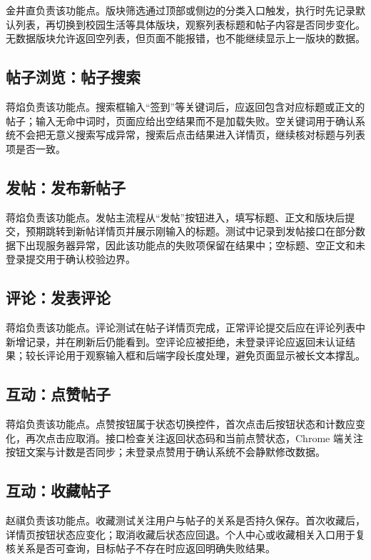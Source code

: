 \documentclass[bwprint]{report}
\begin{document}
金井直负责该功能点。版块筛选通过顶部或侧边的分类入口触发，执行时先记录默认列表，再切换到校园生活等具体版块，观察列表标题和帖子内容是否同步变化。无数据版块允许返回空列表，但页面不能报错，也不能继续显示上一版块的数据。

\subsection{帖子浏览：帖子搜索}

蒋焰负责该功能点。搜索框输入“签到”等关键词后，应返回包含对应标题或正文的帖子；输入无命中词时，页面应给出空结果而不是加载失败。空关键词用于确认系统不会把无意义搜索写成异常，搜索后点击结果进入详情页，继续核对标题与列表项是否一致。

\subsection{发帖：发布新帖子}

蒋焰负责该功能点。发帖主流程从“发帖”按钮进入，填写标题、正文和版块后提交，预期跳转到新帖详情页并展示刚输入的标题。测试中记录到发帖接口在部分数据下出现服务器异常，因此该功能点的失败项保留在结果中；空标题、空正文和未登录提交用于确认校验边界。

\subsection{评论：发表评论}

蒋焰负责该功能点。评论测试在帖子详情页完成，正常评论提交后应在评论列表中新增记录，并在刷新后仍能看到。空评论应被拒绝，未登录评论应返回未认证结果；较长评论用于观察输入框和后端字段长度处理，避免页面显示被长文本撑乱。

\subsection{互动：点赞帖子}

蒋焰负责该功能点。点赞按钮属于状态切换控件，首次点击后按钮状态和计数应变化，再次点击应取消。接口检查关注返回状态码和当前点赞状态，Chrome 端关注按钮文案与计数是否同步；未登录点赞用于确认系统不会静默修改数据。

\subsection{互动：收藏帖子}

赵祺负责该功能点。收藏测试关注用户与帖子的关系是否持久保存。首次收藏后，详情页按钮状态应变化；取消收藏后状态应回退。个人中心或收藏相关入口用于复核关系是否可查询，目标帖子不存在时应返回明确失败结果。
\end{document}
